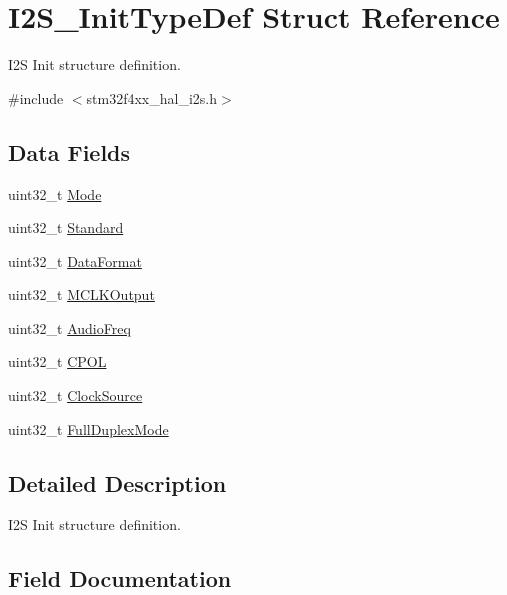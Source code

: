 \hypertarget{struct_i2_s___init_type_def}{}\section{I2\+S\+\_\+\+Init\+Type\+Def Struct Reference}
\label{struct_i2_s___init_type_def}


I2S Init structure definition.  




{\ttfamily \#include $<$stm32f4xx\+\_\+hal\+\_\+i2s.\+h$>$}

\subsection*{Data Fields}
\begin{DoxyCompactItemize}
\item 
uint32\+\_\+t \hyperlink{struct_i2_s___init_type_def_abcd2a46537eee4ed23fa1642c5234ea8}{Mode}
\item 
uint32\+\_\+t \hyperlink{struct_i2_s___init_type_def_a8fc84bad7ae403ab4231b37077f9d99f}{Standard}
\item 
uint32\+\_\+t \hyperlink{struct_i2_s___init_type_def_aa968e67a06e23282776bd7b615a8c1cc}{Data\+Format}
\item 
uint32\+\_\+t \hyperlink{struct_i2_s___init_type_def_ad0d868889f53bdda32fa5c201efa2a12}{M\+C\+L\+K\+Output}
\item 
uint32\+\_\+t \hyperlink{struct_i2_s___init_type_def_a5c42be6d3eb4713f0d4fc202cae95553}{Audio\+Freq}
\item 
uint32\+\_\+t \hyperlink{struct_i2_s___init_type_def_aff339ae5b4099da49e6970dd59c41afe}{C\+P\+OL}
\item 
uint32\+\_\+t \hyperlink{struct_i2_s___init_type_def_a6a0c9c91b9530465cc2347c758a2fdf3}{Clock\+Source}
\item 
uint32\+\_\+t \hyperlink{struct_i2_s___init_type_def_a3126fcf92721ac72c91cc870fcef1ffe}{Full\+Duplex\+Mode}
\end{DoxyCompactItemize}


\subsection{Detailed Description}
I2S Init structure definition. 

\subsection{Field Documentation}
\mbox{\label{struct_i2_s___init_type_def_a5c42be6d3eb4713f0d4fc202cae95553}} 
